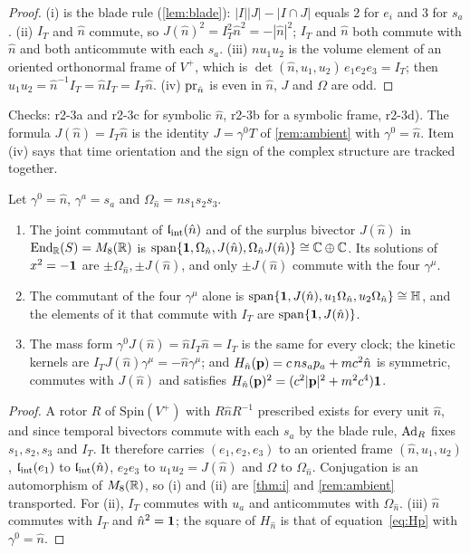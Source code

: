 \begin{proof}
(i) is the blade rule (\cref{lem:blade}): $|I||J|-|I\cap J|$ equals $2$ for $e_i$ and $3$ for $s_a$. (ii) $I_T$ and $\hat n$
commute, so $J(\hat n)^2=I_T^2\hat n^2=-|\hat n|^2$; $I_T$ and $\hat n$ both commute with $\hat n$ and both anticommute with each $s_a$. (iii) $nu_1u_2$ is the volume element of
an oriented orthonormal frame of $V^+$, which is $\det(\hat n,u_1,u_2)\,e_1e_2e_3=I_T$; then $u_1u_2=\hat n^{-1}I_T=\hat nI_T=I_T\hat n$. (iv) $\operatorname{pr}_{\hat n}$ is even in $\hat n$,
$J$ and $\Omega$ are odd.
\end{proof}

Checks: r2-3a and r2-3c for symbolic $\hat n$, r2-3b for a
symbolic frame, r2-3d). The formula $J(\hat n)=I_T\hat n$ is the identity $J=\gamma^0T$ of \cref{rem:ambient} with $\gamma^0=\hat n$. Item (iv) says that time orientation and the sign of the complex structure are tracked together.

\begin{theorem}
\label{r2:thm:i}
Let $\gamma^0=\hat n$, $\gamma^a=s_a$ and $\Omega_{\hat n}=ns_1s_2s_3$.
\begin{enumerate}[label=(\roman*),leftmargin=2.2em]
\item The joint commutant of $\mathfrak l_{\rm int}(\hat n)$ and of the surplus bivector $J(\hat n)$ in $\operatorname{End}_{\mathbb{R}}(S)=M_8(\mathbb{R})$ is $\operatorname{span}\{\mathbf 1,\Omega_{\hat n},J(\hat n),\Omega_{\hat n}J(\hat n)\}
\cong\mathbb{C}\oplus\mathbb{C}$. Its solutions of $x^2=-\mathbf 1$ are $\pm\Omega_{\hat n},\pm J(\hat n)$, and only $\pm J(\hat n)$ commute with the four $\gamma^\mu$.
\item The commutant of the four $\gamma^\mu$ alone is $\operatorname{span}\{\mathbf 1,J(\hat n),u_1\Omega_{\hat n},u_2\Omega_{\hat n}\}\cong\mathbb{H}$, and the elements of it that
commute with $I_T$ are $\operatorname{span}\{\mathbf 1,J(\hat n)\}$.
\item The mass form $\gamma^0J(\hat n)=\hat nI_T\hat n=I_T$ is the same for every clock; the kinetic kernels are $I_TJ(\hat n)\gamma^\mu=-\hat n\gamma^\mu$; and
$H_{\hat n}(\mathbf p)=c\,ns_ap_a+mc^2\hat n$ is symmetric, commutes with $J(\hat n)$ and satisfies $H_{\hat n}(\mathbf p)^2=(c^2|\mathbf p|^2+m^2c^4)\mathbf 1$.
\end{enumerate}
\end{theorem}

\begin{proof}
A rotor $R$ of $\mathrm{Spin}(V^+)$ with $R\hat nR^{-1}$ prescribed exists for every unit $\hat n$, and since temporal bivectors commute with each $s_a$ by the
blade rule, $\operatorname{Ad}_R$ fixes $s_1,s_2,s_3$ and $I_T$. It therefore carries $(e_1,e_2,e_3)$ to an oriented frame $(\hat n,u_1,u_2)$, $\mathfrak l_{\rm int}(e_1)$ to $\mathfrak l_{\rm int}(\hat n)$,
$e_2e_3$ to $u_1u_2=J(\hat n)$ and $\Omega$ to $\Omega_{\hat n}$. Conjugation is an automorphism of $M_8(\mathbb{R})$, so (i) and (ii) are \cref{thm:i} and \cref{rem:ambient} transported. For (ii), $I_T$ commutes with $u_a$ and anticommutes with $\Omega_{\hat n}$. (iii) $\hat n$ commutes with $I_T$ and $\hat n^2=\mathbf 1$; the square of
$H_{\hat n}$ is that of equation~\cref{eq:Hp} with $\gamma^0=\hat n$.
\end{proof}

